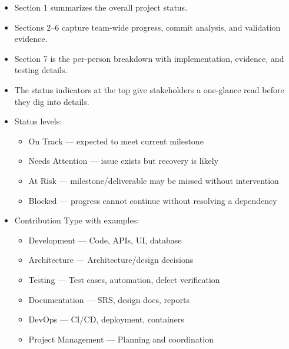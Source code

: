 \documentclass[11pt,a4paper]{article}
\begin{document}
\begin{itemize}
    \item Section 1 summarizes the overall project status.
    \item Sections 2--6 capture team-wide progress, commit analysis, and validation evidence.
    \item Section 7 is the per-person breakdown with implementation, evidence, and testing details.
    \item The status indicators at the top give stakeholders a one-glance read before they dig into details.
    \item Status levels:
    \begin{itemize}
        \item On Track --- expected to meet current milestone
        \item Needs Attention --- issue exists but recovery is likely
        \item At Risk --- milestone/deliverable may be missed without intervention
        \item Blocked --- progress cannot continue without resolving a dependency
    \end{itemize}
    \item Contribution Type with examples:
    \begin{itemize}
        \item Development --- Code, APIs, UI, database
        \item Architecture --- Architecture/design decisions
        \item Testing --- Test cases, automation, defect verification
        \item Documentation --- SRS, design docs, reports
        \item DevOps --- CI/CD, deployment, containers
        \item Project Management --- Planning and coordination
    \end{itemize}
\end{itemize}
\end{document}

